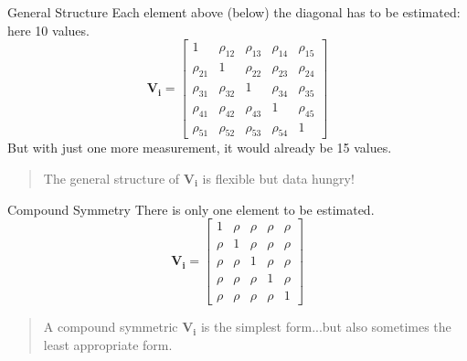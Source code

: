 \documentclass{beamer}
\begin{document}
\begin{frame}{General Structure}
  Each element above (below) the diagonal has to be estimated: here 10 values.
  \[
  \mathbf{V_i} = 
  \begin{bmatrix}
  1 & \rho_{12} & \rho_{13} & \rho_{14} & \rho_{15} \\
  \rho_{21} & 1 & \rho_{22} & \rho_{23} & \rho_{24} \\
  \rho_{31} & \rho_{32} & 1 & \rho_{34} & \rho_{35} \\
  \rho_{41} & \rho_{42} & \rho_{43} & 1 & \rho_{45} \\
  \rho_{51} & \rho_{52} & \rho_{53} & \rho_{54} & 1
  \end{bmatrix}
  \]
  But with just one more measurement, it would already be 15 values.
  \vspace{0.5cm}
  
  \begin{quote}
    The general structure of $\mathbf{V_i}$ is flexible but data hungry!
  \end{quote}
\end{frame}

\begin{frame}{Compound Symmetry}
  \centering There is only one element to be estimated.
  \[
  \mathbf{V_i} = 
  \begin{bmatrix}
  1 & \rho & \rho & \rho & \rho \\
  \rho & 1 & \rho & \rho & \rho \\
  \rho & \rho & 1 & \rho & \rho \\
  \rho & \rho & \rho & 1 & \rho \\
  \rho & \rho & \rho & \rho & 1
  \end{bmatrix}
  \]
  \vspace{0.5cm}
  
  \begin{quote}
    A compound symmetric $\mathbf{V_i}$ is the simplest form...but also sometimes the least appropriate form.
  \end{quote}
\end{frame}
\end{document}
